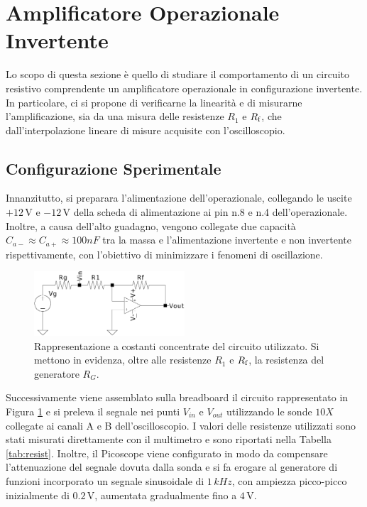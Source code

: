 \documentclass[a4paper,11pt]{article}
\begin{document}
\section{Amplificatore Operazionale Invertente}\label{s:ampinv}
Lo scopo di questa sezione è quello di studiare il comportamento di un circuito resistivo comprendente un amplificatore operazionale in configurazione invertente. In particolare, ci si propone di verificarne la linearità e di misurarne l'amplificazione, sia da una misura delle resistenze $R_1$ e $R_\text f$, che dall'interpolazione lineare di misure acquisite con l'oscilloscopio.

\subsection{Configurazione Sperimentale}\label{s:conf_lin}

Innanzitutto, si preparara l'alimentazione dell'operazionale, collegando le uscite
$+12\,\si{\volt}$ e $-12\,\si{\volt}$ della scheda di alimentazione ai pin n.8 e n.4 dell'operazionale.
Inoltre, a causa dell'alto guadagno, vengono collegate due capacità
$C_{a-}\approx C_{a+} \approx 100\si{nF}$ tra la massa e l'alimentazione invertente e non invertente
rispettivamente, con l'obiettivo di minimizzare i fenomeni di oscillazione.

\begin{figure}
\centering
\includegraphics[width=0.5\textwidth]{images/circuit_inv}
\caption{\footnotesize Rappresentazione a costanti concentrate del circuito utilizzato.
  Si mettono in evidenza, oltre alle resistenze $R_{1}$ e $R_{\text f}$, la resistenza del
generatore $R_{G}$.}\label{fig:wrapfig}
\end{figure}
\noindent Successivamente viene assemblato sulla breadboard il circuito rappresentato in Figura \ref{fig:wrapfig}
e si preleva il segnale nei punti $V_{in}$ e $V_{out}$ utilizzando le sonde
$10X$ collegate ai canali A e B dell'oscilloscopio. I valori delle resistenze utilizzati sono stati
misurati direttamente con il multimetro e sono riportati nella Tabella \ref{tab:resist}.
Inoltre, il Picoscope viene configurato in modo da compensare l'attenuazione del segnale dovuta dalla sonda e si fa erogare al generatore di funzioni incorporato un segnale sinusoidale di $1\,\si{kHz}$, con ampiezza picco-picco inizialmente di $0.2\, \si{\volt}$, aumentata gradualmente fino a $4\,\si{\volt}$.
\end{document}
